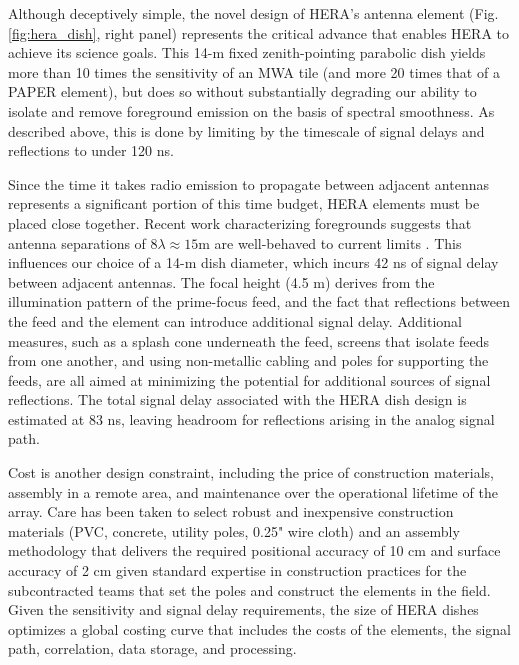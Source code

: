 \documentclass[preprint]{aastex}
\begin{document}
Although deceptively simple, the novel design of HERA's antenna element
(Fig. \ref{fig:hera_dish}, right panel) represents the critical advance
that enables HERA to achieve its science goals.  This 14-m
fixed zenith-pointing parabolic dish yields more than 10 times the
sensitivity of an MWA tile (and more 20 times
that of a PAPER element), but does so without substantially degrading
our ability to isolate and remove foreground emission on the basis of
spectral smoothness.  As described above, this is done by limiting by 
the timescale of signal delays and reflections to under 120 ns.

Since the time it takes radio emission to propagate between adjacent antennas 
represents a significant portion of this time budget, HERA elements must be placed close together.
Recent work characterizing foregrounds suggests that 
antenna separations of $8\lambda \approx 15$m are
well-behaved to current limits \citep{pober_et_al2013,parsons_et_al2013}. This influences our
choice of a 14-m dish diameter,
which incurs 42 ns of signal delay between adjacent antennas.
The focal height (4.5 m) derives from the illumination pattern of the prime-focus
feed, and the fact that reflections
between the feed and the element%
can introduce additional signal delay. 
Additional measures, such as a splash cone underneath the feed, screens that isolate feeds from one another, and using
non-metallic cabling and poles for supporting the feeds, are all aimed at minimizing
the potential for additional sources of signal reflections.
The total signal delay associated with the HERA dish design is estimated at 83 ns, leaving
headroom for reflections arising in the analog signal path.

Cost is another design constraint, including the price of construction
materials, assembly in a remote area, and maintenance over the operational
lifetime of the array.  Care has been taken to select robust and inexpensive
construction materials (PVC, concrete, utility poles, 0.25" wire cloth) and an assembly methodology that delivers the required positional
accuracy of 10 cm and surface accuracy of 2 cm given standard expertise in construction
practices for the subcontracted teams that set the poles and construct the
elements in the field.  
Given the sensitivity and signal delay requirements, the size of HERA
dishes optimizes a global costing curve that includes the costs of the elements,
the signal path, correlation, data storage, and processing.
\end{document}
